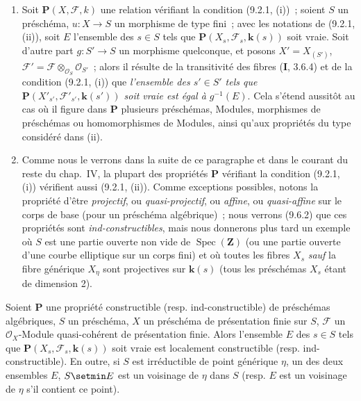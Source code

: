 \begin{remarks}[9.2.2]
\begin{enumerate}[label=(\roman*)]
  \item Soit $\boldsymbol{P}(X,\mathcal F,k)$ une relation vérifiant la condition
  (9.2.1, (i))~; soient $S$ un préschéma, $u:X\to S$ un morphisme de type
  fini~; avec les notations de (9.2.1, (ii)), soit $E$ l'ensemble des $s\in S$
  tels que $\boldsymbol{P}(X_s,\mathcal F_s,\boldsymbol{k}(s))$ soit vraie. Soit d'autre part
  $g:S'\to S$ un morphisme quelconque, et posons
  $X'=X_{(S')}$, $\mathcal F'=\mathcal F\otimes_{\mathcal O_S}\mathcal O_{S'}$~;
  alors il résulte de la transitivité des fibres (\textbf{I}, 3.6.4) et de la condition
  (9.2.1, (i)) que \emph{l'ensemble des $s'\in S'$ tels que
  $\boldsymbol{P}(X'_{s'},\mathcal F'_{s'},\boldsymbol{k}(s'))$ soit vraie est égal à
  $g^{-1}(E)$}. Cela s'étend aussitôt au cas où il figure dans $\boldsymbol{P}$
  plusieurs préschémas, Modules, morphismes de préschémas ou homomorphismes de
  Modules, ainsi qu'aux propriétés du type considéré dans (ii).

  \item Comme nous le verrons dans la suite de ce paragraphe et dans le courant
  du reste du chap.~IV, la plupart des propriétés $\boldsymbol{P}$ vérifiant la
  condition (9.2.1, (i)) vérifient aussi (9.2.1, (ii)). Comme exceptions
  possibles, notons la propriété d'être \emph{projectif}, ou
  \emph{quasi-projectif}, ou \emph{affine}, ou \emph{quasi-affine} sur le
  corps de base (pour un préschéma algébrique)~; nous verrons (9.6.2) que ces
  propriétés sont \emph{ind-constructibles}, mais nous donnerons plus tard un
  exemple où $S$ est une partie ouverte non vide de $\operatorname{Spec}(\mathbf Z)$
  (ou une partie ouverte d'une courbe elliptique sur un corps fini) et où
  toutes les fibres $X_s$
  \emph{sauf} la fibre générique $X_\eta$ sont projectives sur $\boldsymbol{k}(s)$ (tous les
  préschémas $X_s$ étant de dimension 2).
\end{enumerate}
\end{remarks}

\begin{proposition}[9.2.3]
\label{IV.9.2.3-fr}
Soient $\boldsymbol{P}$ une propriété constructible (\textup{resp.} ind-constructible) de
préschémas algébriques, $S$ un préschéma, $X$ un préschéma de présentation
finie sur $S$, $\mathcal F$ un $\mathcal O_X$-Module quasi-cohérent de
présentation finie. Alors l'ensemble $E$ des $s\in S$ tels que
$\boldsymbol{P}(X_s,\mathcal F_s,\boldsymbol{k}(s))$ soit vraie est localement constructible
(\textup{resp.} ind-constructible). En outre, si $S$ est irréductible de point générique
$\eta$, un des deux ensembles $E$, $S\setmin E$ est un voisinage de $\eta$ dans $S$
(\textup{resp.} $E$ est un voisinage de $\eta$ s'il contient ce point).
\end{proposition}

